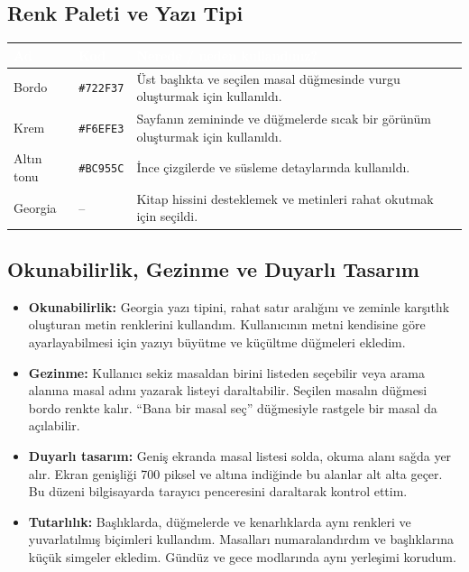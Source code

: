 \documentclass[12pt,a4paper]{article}
\begin{document}
\subsection{Renk Paleti ve Yazı Tipi}
\begin{center}
\begin{tabular}{@{}llp{6.4cm}@{}}
\toprule
\rowcolor{ana}\textcolor{white}{\textbf{Ad}} & \textcolor{white}{\textbf{Kod}} & \textcolor{white}{\textbf{Nerede / neden kullandınız?}} \\
\midrule

Bordo & \texttt{\#722F37} & Üst başlıkta ve seçilen masal düğmesinde vurgu oluşturmak için kullanıldı. \tabularnewline
Krem & \texttt{\#F6EFE3} & Sayfanın zemininde ve düğmelerde sıcak bir görünüm oluşturmak için kullanıldı. \tabularnewline
Altın tonu & \texttt{\#BC955C} & İnce çizgilerde ve süsleme detaylarında kullanıldı. \tabularnewline
Georgia & -- & Kitap hissini desteklemek ve metinleri rahat okutmak için seçildi. \tabularnewline
\bottomrule
\end{tabular}
\end{center}

\subsection{Okunabilirlik, Gezinme ve Duyarlı Tasarım}
\begin{itemize}
  \item \textbf{Okunabilirlik:} Georgia yazı tipini, rahat satır aralığını ve zeminle karşıtlık oluşturan metin renklerini kullandım. Kullanıcının metni kendisine göre ayarlayabilmesi için yazıyı büyütme ve küçültme düğmeleri ekledim.
  \item \textbf{Gezinme:} Kullanıcı sekiz masaldan birini listeden seçebilir veya arama alanına masal adını yazarak listeyi daraltabilir. Seçilen masalın düğmesi bordo renkte kalır. “Bana bir masal seç” düğmesiyle rastgele bir masal da açılabilir.
  \item \textbf{Duyarlı tasarım:} Geniş ekranda masal listesi solda, okuma alanı sağda yer alır. Ekran genişliği 700 piksel ve altına indiğinde bu alanlar alt alta geçer. Bu düzeni bilgisayarda tarayıcı penceresini daraltarak kontrol ettim.
  \item \textbf{Tutarlılık:} Başlıklarda, düğmelerde ve kenarlıklarda aynı renkleri ve yuvarlatılmış biçimleri kullandım. Masalları numaralandırdım ve başlıklarına küçük simgeler ekledim. Gündüz ve gece modlarında aynı yerleşimi korudum.
\end{itemize}
\end{document}
